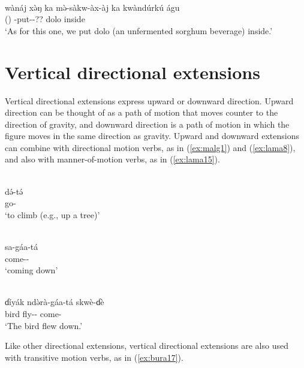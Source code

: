 \ex\label{ex:mata11}
 \\
\gll  wànáj xə̀ŋ ka mə̀-sàkw-àx-àj ka kwàndúrkú águ	\\
 ()  -put--??  dolo inside		\\
\glt `As for this one, we put dolo (an unfermented sorghum beverage) inside.'
\z 

\section{Vertical directional extensions} \label{sec:vertical1}

Vertical directional extensions express upward or downward direction. Upward direction can be thought of as a path of motion that moves counter to the direction of gravity, and downward direction is a path of motion in which the figure moves in the same direction as gravity. Upward and downward extensions can combine with directional motion verbs, as in (\ref{ex:malg1}) and (\ref{ex:lama8}), and also with manner-of-motion verbs, as in (\ref{ex:lama15}). 

\ea\label{ex:malg1}
 \\
\gll də́-tə́ \\
go- \\
\glt `to climb (e.g., up a tree)'

\ex\label{ex:lama8}
 \\
\gll sa-gáa-tá	\\
come--	 \\
\glt `coming down'

\ex\label{ex:lama15}
 \\
\gll ɗíyák ndə̀rà-gáa-tá skwè-ɗè	\\
bird fly-- come-		\\
\glt `The bird flew down.'
\z 

Like other directional extensions, vertical directional extensions are also used with transitive motion verbs, as in (\ref{ex:bura17}). 

